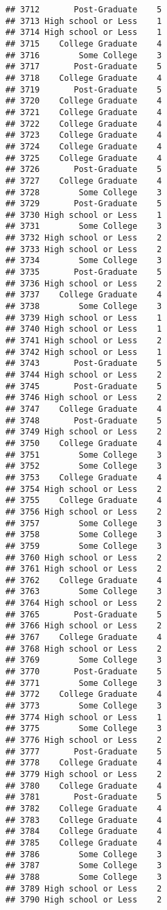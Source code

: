 \documentclass[
]{article}
\begin{document}
\begin{verbatim}
## 3712       Post-Graduate    5
## 3713 High school or Less    1
## 3714 High school or Less    1
## 3715    College Graduate    4
## 3716        Some College    3
## 3717       Post-Graduate    5
## 3718    College Graduate    4
## 3719       Post-Graduate    5
## 3720    College Graduate    4
## 3721    College Graduate    4
## 3722    College Graduate    4
## 3723    College Graduate    4
## 3724    College Graduate    4
## 3725    College Graduate    4
## 3726       Post-Graduate    5
## 3727    College Graduate    4
## 3728        Some College    3
## 3729       Post-Graduate    5
## 3730 High school or Less    1
## 3731        Some College    3
## 3732 High school or Less    2
## 3733 High school or Less    2
## 3734        Some College    3
## 3735       Post-Graduate    5
## 3736 High school or Less    2
## 3737    College Graduate    4
## 3738        Some College    3
## 3739 High school or Less    1
## 3740 High school or Less    1
## 3741 High school or Less    2
## 3742 High school or Less    1
## 3743       Post-Graduate    5
## 3744 High school or Less    2
## 3745       Post-Graduate    5
## 3746 High school or Less    2
## 3747    College Graduate    4
## 3748       Post-Graduate    5
## 3749 High school or Less    2
## 3750    College Graduate    4
## 3751        Some College    3
## 3752        Some College    3
## 3753    College Graduate    4
## 3754 High school or Less    2
## 3755    College Graduate    4
## 3756 High school or Less    2
## 3757        Some College    3
## 3758        Some College    3
## 3759        Some College    3
## 3760 High school or Less    2
## 3761 High school or Less    2
## 3762    College Graduate    4
## 3763        Some College    3
## 3764 High school or Less    2
## 3765       Post-Graduate    5
## 3766 High school or Less    2
## 3767    College Graduate    4
## 3768 High school or Less    2
## 3769        Some College    3
## 3770       Post-Graduate    5
## 3771        Some College    3
## 3772    College Graduate    4
## 3773        Some College    3
## 3774 High school or Less    1
## 3775        Some College    3
## 3776 High school or Less    2
## 3777       Post-Graduate    5
## 3778    College Graduate    4
## 3779 High school or Less    2
## 3780    College Graduate    4
## 3781       Post-Graduate    5
## 3782    College Graduate    4
## 3783    College Graduate    4
## 3784    College Graduate    4
## 3785    College Graduate    4
## 3786        Some College    3
## 3787        Some College    3
## 3788        Some College    3
## 3789 High school or Less    2
## 3790 High school or Less    2

\end{verbatim}
\end{document}
